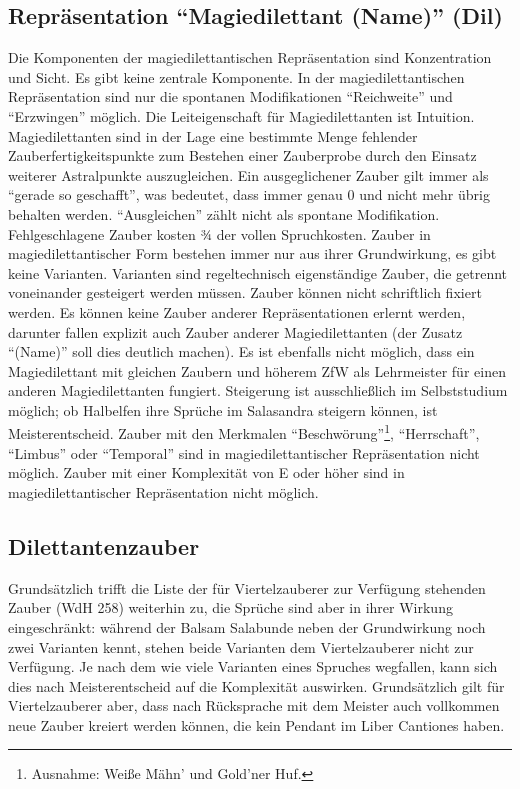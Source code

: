 \subsection{Repräsentation \enquote{Magiedilettant (Name)} (Dil)}
Die Komponenten der magiedilettantischen Repräsentation sind Konzentration und Sicht. Es gibt keine zentrale Komponente. In der magiedilettantischen Repräsentation sind nur die spontanen Modifikationen \enquote{Reichweite} und \enquote{Erzwingen} möglich. Die Leiteigenschaft für Magiedilettanten ist Intuition. Magiedilettanten sind in der Lage eine bestimmte Menge fehlender Zauberfertigkeitspunkte zum Bestehen einer Zauberprobe durch den Einsatz weiterer Astralpunkte auszugleichen. Ein ausgeglichener Zauber gilt immer als \enquote{gerade so geschafft}, was bedeutet, dass immer genau \SI{0}{\ZfPstern} und nicht mehr übrig behalten werden. \enquote{Ausgleichen} zählt nicht als spontane Modifikation. Fehlgeschlagene Zauber kosten ¾ der vollen Spruchkosten. Zauber in magiedilettantischer Form bestehen immer nur aus ihrer Grundwirkung, es gibt keine Varianten. Varianten sind regeltechnisch eigenständige Zauber, die getrennt voneinander gesteigert werden müssen. Zauber können nicht schriftlich fixiert werden. Es können keine Zauber anderer Repräsentationen erlernt werden, darunter fallen explizit auch Zauber anderer Magiedilettanten (der Zusatz \enquote{(Name)} soll dies deutlich machen). Es ist ebenfalls nicht möglich, dass ein Magiedilettant mit gleichen Zaubern und höherem ZfW als Lehrmeister für einen anderen Magiedilettanten fungiert. Steigerung ist ausschließlich im Selbststudium möglich; ob Halbelfen ihre Sprüche im Salasandra steigern können, ist Meisterentscheid. Zauber mit den Merkmalen \enquote{Beschwörung}\footnote{Ausnahme: Weiße Mähn' und Gold'ner Huf.}, \enquote{Herrschaft}, \enquote{Limbus} oder \enquote{Temporal} sind in magiedilettantischer Repräsentation nicht möglich. Zauber mit einer Komplexität von E oder höher sind in magiedilettantischer Repräsentation nicht möglich.

\subsection{Dilettantenzauber}
Grundsätzlich trifft die Liste der für Viertelzauberer zur Verfügung stehenden Zauber (WdH 258) weiterhin zu, die Sprüche sind aber in ihrer Wirkung eingeschränkt: während der Balsam Salabunde neben der Grundwirkung noch zwei Varianten kennt, stehen beide Varianten dem Viertelzauberer nicht zur Verfügung. Je nach dem wie viele Varianten eines Spruches wegfallen, kann sich dies nach Meisterentscheid auf die Komplexität auswirken. Grundsätzlich gilt für Viertelzauberer aber, dass nach Rücksprache mit dem Meister auch vollkommen neue Zauber kreiert werden können, die kein Pendant im Liber Cantiones haben.

